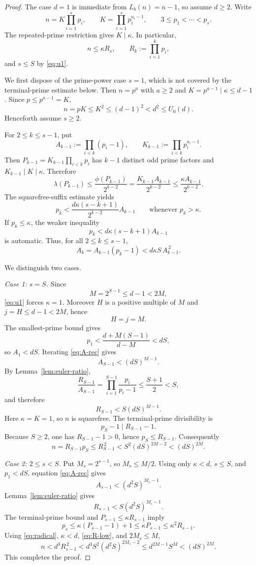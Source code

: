 \documentclass[11pt]{article}
\begin{document}
\begin{proof}
The case $d=1$ is immediate from $L_b(n)=n-1$, so assume $d\ge2$.
Write
\[
n=K\prod_{i=1}^{s}p_i,
\qquad
K=\prod_{i=1}^{s}p_i^{a_i-1},
\qquad
3\le p_1<\cdots<p_s.
\]
The repeated-prime restriction gives $K\mid\kappa$.  In particular,
\[
n\le \kappa R_s,
\qquad
R_k:=\prod_{i=1}^{k}p_i,
\tag{U3}\label{eq:radical}
\]
and $s\le S$ by \eqref{eq:u1}.

We first dispose of the prime-power case $s=1$, which is not covered by the
terminal-prime estimate below.  Then $n=p^a$ with $a\ge2$ and
$K=p^{a-1}\mid\kappa\le d-1$.  Since $p\le p^{a-1}=K$,
\[
n=pK\le K^2\le(d-1)^2<d^2\le U_0(d).
\]
Henceforth assume $s\ge2$.

For $2\le k\le s-1$, put
\[
A_{k-1}:=\prod_{i<k}(p_i-1),
\qquad
K_{k-1}:=\prod_{i<k}p_i^{a_i-1}.
\]
Then
$P_{k-1}=K_{k-1}\prod_{i<k}p_i$ has $k-1$ distinct odd prime factors and
$K_{k-1}\mid K\mid\kappa$.  Therefore
\[
\lambda(P_{k-1})
 \le \frac{\phi(P_{k-1})}{2^{k-2}}
 = \frac{K_{k-1}A_{k-1}}{2^{k-2}}
 \le \frac{\kappa A_{k-1}}{2^{k-2}}.
\]
The squarefree-suffix estimate yields
\[
p_k<
\frac{d\kappa(s-k+1)}{2^{k-2}}A_{k-1}
\qquad\text{whenever }p_k>\kappa.
\tag{U4}\label{eq:pk-sharp}
\]
If $p_k\le\kappa$, the weaker inequality
\[
p_k<d\kappa(s-k+1)A_{k-1}
\]
is automatic.  Thus, for all $2\le k\le s-1$,
\[
A_k=A_{k-1}(p_k-1)
<d\kappa S\,A_{k-1}^{\,2}.
\tag{U5}\label{eq:A-rec}
\]

We distinguish two cases.

\smallskip
\noindent\emph{Case 1: $s=S$.}
Since
\[
M=2^{S-1}\le d-1<2M,
\]
\eqref{eq:u1} forces $\kappa=1$.  Moreover $H$ is a positive multiple of
$M$ and $j=H\le d-1<2M$, hence
\[
H=j=M.
\]
The smallest-prime bound gives
\[
p_1<\frac{d+M(S-1)}{d-M}<dS,
\]
so $A_1<dS$.  Iterating \eqref{eq:A-rec} gives
\[
A_{S-1}<(dS)^{M-1}.
\tag{U6}\label{eq:A-top}
\]
By Lemma~\ref{lem:euler-ratio},
\[
\frac{R_{S-1}}{A_{S-1}}
=\prod_{i=1}^{S-1}\frac{p_i}{p_i-1}
\le\frac{S+1}{2}<S,
\]
and therefore
\[
R_{S-1}<S(dS)^{M-1}.
\]
Here $\kappa=K=1$, so $n$ is squarefree.  The terminal-prime divisibility is
\[
p_S-1\mid R_{S-1}-1.
\]
Because $S\ge2$, one has $R_{S-1}-1>0$, hence
$p_S\le R_{S-1}$.  Consequently
\[
n=R_{S-1}p_S
\le R_{S-1}^{\,2}
<S^2(dS)^{2M-2}
<(dS)^{2M}.
\]

\smallskip
\noindent\emph{Case 2: $2\le s<S$.}
Put $M_s=2^{s-1}$, so $M_s\le M/2$.  Using only
$\kappa<d$, $s\le S$, and $p_1<dS$, equation \eqref{eq:A-rec} gives
\[
A_{s-1}<(d^2S)^{M_s-1}.
\]
Lemma~\ref{lem:euler-ratio} gives
\[
R_{s-1}<S(d^2S)^{M_s-1}.
\tag{U7}\label{eq:R-low}
\]
The terminal-prime bound and $P_{s-1}\le\kappa R_{s-1}$ imply
\[
p_s\le\kappa(P_{s-1}-1)+1\le\kappa P_{s-1}
\le\kappa^2R_{s-1}.
\]
Using \eqref{eq:radical}, $\kappa<d$, \eqref{eq:R-low}, and $2M_s\le M$,
\[
n<d^3R_{s-1}^{\,2}
<d^3S^2(d^2S)^{2M_s-2}
\le d^{2M-1}S^M
<(dS)^{2M}.
\]
This completes the proof.
\end{proof}
\end{document}
